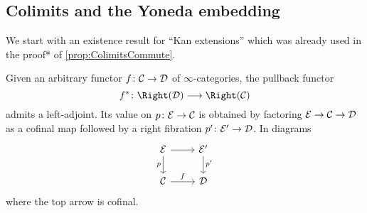 \subsection{Colimits and the Yoneda embedding}
We start with an existence result for \enquote{Kan extensions} which was already used in the proof* of \cref{prop:ColimitsCommute}.
\begin{thm}[Joyal]\label{thm:JoyalRightFibrations}
	Given an arbitrary functor $f\colon \Cc\morphism\Dd$ of $\infty$-categories, the pullback functor 
	\begin{equation*}
		f^*\colon \Right(\Dd)\morphism\Right(\Cc)
	\end{equation*}
	admits a left-adjoint. Its value on $p\colon \Ee\morphism\Cc$ is obtained by factoring $\Ee\morphism\Cc\morphism\Dd$ as a cofinal map followed by a right fibration $p'\colon\Ee'\morphism\Dd$. In diagrams
	\begin{equation*}
		\begin{tikzcd}
			\Ee\dar["p"']\rar& \Ee'\dar["\vphantom{p}\smash{p'}"]\\
			\Cc\rar["f"]&\Dd
		\end{tikzcd}
	\end{equation*}
	where the top arrow is cofinal.
\end{thm}
